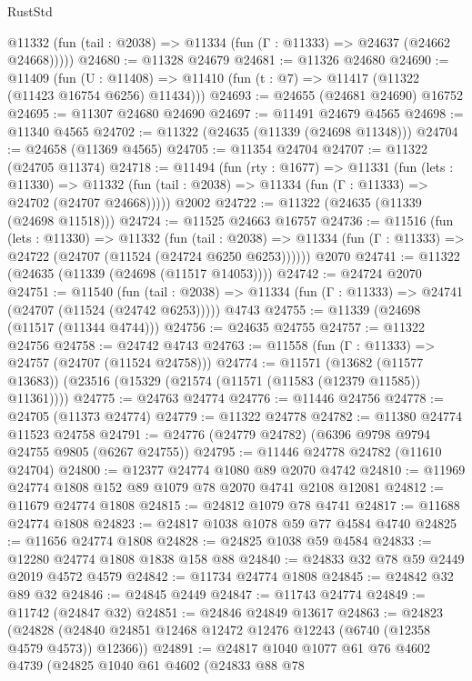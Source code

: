 \begin{lexlean}{RustStd}
\begin{coremodule}
      @11332 (fun (tail : @2038) => @11334 (fun (Γ : @11333) => @24637 (@24662 @24668)))))
@24680 := @11328 @24679
@24681 := @11326 @24680
@24690 := @11409
    (fun (U : @11408) => @11410 (fun (t : @7) => @11417 (@11322 (@11423 @16754 @6256) @11434)))
@24693 := @24655 (@24681 @24690) @16752
@24695 := @11307 @24680 @24690
@24697 := @11491 @24679 @4565
@24698 := @11340 @4565
@24702 := @11322 (@24635 (@11339 (@24698 @11348)))
@24704 := @24658 (@11369 @4565)
@24705 := @11354 @24704
@24707 := @11322 (@24705 @11374)
@24718 := @11494
    (fun (rty : @1677) =>
    @11331
      (fun (lets : @11330) =>
      @11332 (fun (tail : @2038) => @11334 (fun (Γ : @11333) => @24702 (@24707 @24668)))))
    @2002
@24722 := @11322 (@24635 (@11339 (@24698 @11518)))
@24724 := @11525 @24663 @16757
@24736 := @11516
    (fun (lets : @11330) =>
    @11332
      (fun (tail : @2038) =>
      @11334 (fun (Γ : @11333) => @24722 (@24707 (@11524 (@24724 @6250 @6253))))))
    @2070
@24741 := @11322 (@24635 (@11339 (@24698 (@11517 @14053))))
@24742 := @24724 @2070
@24751 := @11540
    (fun (tail : @2038) => @11334 (fun (Γ : @11333) => @24741 (@24707 (@11524 (@24742 @6253)))))
    @4743
@24755 := @11339 (@24698 (@11517 (@11344 @4744)))
@24756 := @24635 @24755
@24757 := @11322 @24756
@24758 := @24742 @4743
@24763 := @11558 (fun (Γ : @11333) => @24757 (@24707 (@11524 @24758)))
@24774 := @11571
    (@13682 (@11577 @13683))
    (@23516 (@15329 (@21574 (@11571 (@11583 (@12379 @11585)) @11361))))
@24775 := @24763 @24774
@24776 := @11446 @24756
@24778 := @24705 (@11373 @24774)
@24779 := @11322 @24778
@24782 := @11380 @24774 @11523 @24758
@24791 := @24776 (@24779 @24782) (@6396 @9798 @9794 @24755 @9805 (@6267 @24755))
@24795 := @11446 @24778 @24782 (@11610 @24704)
@24800 := @12377 @24774 @1080 @89 @2070 @4742
@24810 := @11969 @24774 @1808 @152 @89 @1079 @78 @2070 @4741 @2108 @12081
@24812 := @11679 @24774 @1808
@24815 := @24812 @1079 @78 @4741
@24817 := @11688 @24774 @1808
@24823 := @24817 @1038 @1078 @59 @77 @4584 @4740
@24825 := @11656 @24774 @1808
@24828 := @24825 @1038 @59 @4584
@24833 := @12280 @24774 @1808 @1838 @158 @88
@24840 := @24833 @32 @78 @59 @2449 @2019 @4572 @4579
@24842 := @11734 @24774 @1808
@24845 := @24842 @32 @89 @32
@24846 := @24845 @2449
@24847 := @11743 @24774
@24849 := @11742 (@24847 @32)
@24851 := @24846 @24849 @13617
@24863 := @24823
    (@24828 (@24840 @24851 @12468 @12472 @12476 @12243 (@6740 (@12358 @4579 @4573)) @12366))
@24891 := @24817
    @1040
    @1077
    @61
    @76
    @4602
    @4739
    (@24825
      @1040
      @61
      @4602
      (@24833
        @88
        @78

\end{coremodule}
\end{lexlean}
